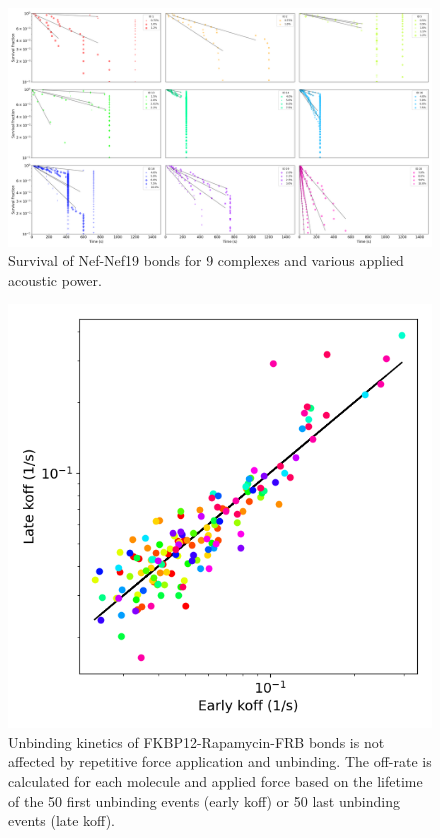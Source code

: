\documentclass{biophys-new}
\begin{document}
\begin{figure}[hbt!]
	\centering
	\centerline {\includegraphics[width=1\linewidth]{Figures/multisurvival2Bis_Nef.png}}
	\caption{Survival of Nef-Nef19 bonds for 9 complexes and various applied acoustic power.}
	\label{fig:MultiSurvival_Nef}	
\end{figure}

\begin{figure}[hbt!]
	\centering
	\includegraphics[width=0.4\linewidth]{Figures/Maturation_Rapa.png}
	\caption{Unbinding kinetics of FKBP12-Rapamycin-FRB bonds is not affected by repetitive force application and unbinding. The off-rate is calculated for each molecule and applied force based on the lifetime of the 50 first unbinding events (early koff) or 50 last unbinding events (late koff). }
	\label{fig:maturation}
\end{figure}


\end{document}
